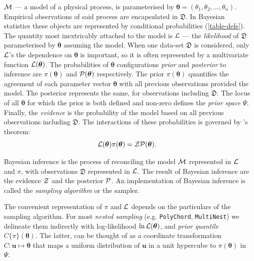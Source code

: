 \documentclass[usenatbib]{mnras}
\begin{document}
\({\cal M}\) --- a model of a physical process, is parameterised by
\(\bm{\theta} = (\theta_{1}, \theta_{2}, \ldots , \theta_{n})\).
Empirical observations of said process are encapsulated in
\(\mathfrak{D}\). In Bayesian statistics these objects are represented
by conditional probabilities (\cref{table-defs}). The quantity most
inextricably attached to the model is ${\cal L}$ --- the
\emph{likelihood} of \(\mathfrak{D}\) parameterised by $\bm{\theta}$
assuming the model. When one data-set \(\mathfrak{D}\) is considered,
only ${\cal L}$'s the dependence on $\bm{\theta}$ is important, so it
is often represented by a multivariate function
${\cal L}(\bm{\theta})$. The probabilities of $\bm{\theta}$
configurations \emph{prior} and \emph{posterior} to inference are
$\pi(\bm{\theta})$ and ${\cal P}(\bm{\theta})$ respectively. The prior
\(\pi(\bm{\theta})\) quantifies the agreement of each parameter vector
$\bm{\theta}$ with all previous observations provided the model. The
posterior represents the same, for observations including
\(\mathfrak{D}\). The locus of all $\bm{\theta}$ for which the prior
is both defined and non-zero defines the \emph{prior space}
$\Psi$. Finally, the \emph{evidence} is the probability of the model
based on all previous observations including \(\mathfrak{D}\). The
interactions of these probabilities is governed by \citeauthor{1763}'s
theorem:
\begin{equation}\label{eq:bayes} 
 {\cal L}(\bm{\theta})  \pi (\bm{\theta}) = {\cal Z}  {\cal P} (\bm{\theta}).  
\end{equation}

Bayesian inference is the process of reconciling the model ${\cal M}$
represented in ${\cal L}$ and $\pi$, with observations
\(\mathfrak{D}\) represented in ${\cal L}$. The result of Bayesian
inference are the evidence ${\cal Z}$ and the posterior ${\cal P}$. An
implementation of Bayesian inference is called the \emph{sampling
  algorithm} or the sampler.

The convenient representation of $\pi$ and ${\cal L}$ depends on the
particulars of the sampling algorithm. For most \emph{nested sampling}
(e.g. \texttt{PolyChord}, \texttt{MultiNest}) we delineate them
indirectly with log-likelihood \(\ln \cal L (\bm{\theta})\), and
\emph{prior quantile} \(C\{\pi\}(\bm{\theta})\). The latter, can be
thought of as a coordinate transformation
$C: \bm{u} \mapsto \bm{\theta}$ that maps a uniform distribution of
$\bm{u}$ in a unit hypercube to $\pi(\bm{\theta})$ in $\Psi$.
\end{document}
